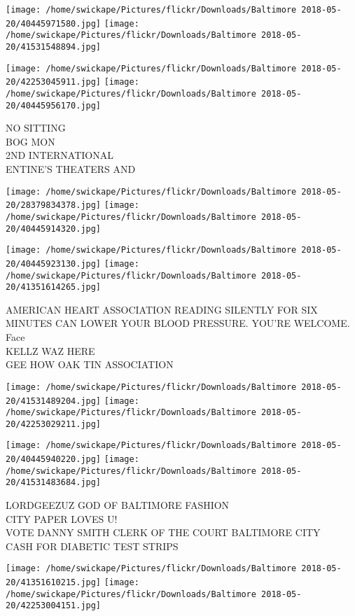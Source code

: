 \documentclass[10pt,letterpaper]{article}
\begin{document}
\texttt{[image: /home/swickape/Pictures/flickr/Downloads/Baltimore 2018-05-20/40445971580.jpg]}
\texttt{[image: /home/swickape/Pictures/flickr/Downloads/Baltimore 2018-05-20/41531548894.jpg]}

\texttt{[image: /home/swickape/Pictures/flickr/Downloads/Baltimore 2018-05-20/42253045911.jpg]}
\texttt{[image: /home/swickape/Pictures/flickr/Downloads/Baltimore 2018-05-20/40445956170.jpg]}

NO SITTING\\
BOG MON\\
2ND INTERNATIONAL\\
ENTINE'S THEATERS AND
\pagebreak

\texttt{[image: /home/swickape/Pictures/flickr/Downloads/Baltimore 2018-05-20/28379834378.jpg]}
\texttt{[image: /home/swickape/Pictures/flickr/Downloads/Baltimore 2018-05-20/40445914320.jpg]}

\texttt{[image: /home/swickape/Pictures/flickr/Downloads/Baltimore 2018-05-20/40445923130.jpg]}
\texttt{[image: /home/swickape/Pictures/flickr/Downloads/Baltimore 2018-05-20/41351614265.jpg]}

AMERICAN HEART ASSOCIATION READING SILENTLY FOR SIX MINUTES CAN LOWER YOUR BLOOD PRESSURE.  YOU'RE WELCOME.\\
Face\\
KELLZ WAZ HERE\\
GEE HOW OAK TIN ASSOCIATION
\pagebreak

\texttt{[image: /home/swickape/Pictures/flickr/Downloads/Baltimore 2018-05-20/41531489204.jpg]}
\texttt{[image: /home/swickape/Pictures/flickr/Downloads/Baltimore 2018-05-20/42253029211.jpg]}

\texttt{[image: /home/swickape/Pictures/flickr/Downloads/Baltimore 2018-05-20/40445940220.jpg]}
\texttt{[image: /home/swickape/Pictures/flickr/Downloads/Baltimore 2018-05-20/41531483684.jpg]}

LORDGEEZUZ GOD OF BALTIMORE FASHION\\
CITY PAPER LOVES U!\\
VOTE DANNY SMITH CLERK OF THE COURT BALTIMORE CITY\\
CASH FOR DIABETIC TEST STRIPS
\pagebreak

\texttt{[image: /home/swickape/Pictures/flickr/Downloads/Baltimore 2018-05-20/41351610215.jpg]}
\texttt{[image: /home/swickape/Pictures/flickr/Downloads/Baltimore 2018-05-20/42253004151.jpg]}
\end{document}

